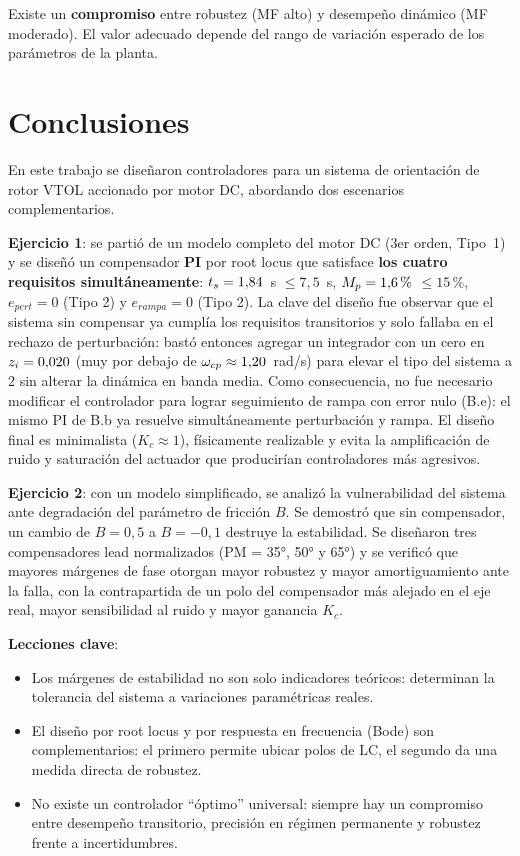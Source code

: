 \documentclass[12pt, a4paper]{article}
\begin{document}
Existe un \textbf{compromiso} entre robustez (MF alto) y desempeño dinámico (MF moderado). El valor adecuado depende del rango de variación esperado de los parámetros de la planta.


\newpage
\section{Conclusiones}

En este trabajo se diseñaron controladores para un sistema de orientación de rotor VTOL accionado por motor DC, abordando dos escenarios complementarios.

\textbf{Ejercicio 1}: se partió de un modelo completo del motor DC (3er orden, Tipo~1) y se diseñó un compensador \textbf{PI} por root locus que satisface \textbf{los cuatro requisitos simultáneamente}: $t_s = 1{,}84$~s $\leq 7{,}5$~s, $M_p = 1{,}6\,\%$ $\leq 15\,\%$, $e_{pert} = 0$ (Tipo 2) y $e_{rampa} = 0$ (Tipo 2). La clave del diseño fue observar que el sistema sin compensar ya cumplía los requisitos transitorios y solo fallaba en el rechazo de perturbación: bastó entonces agregar un integrador con un cero en $z_i = 0{,}020$ (muy por debajo de $\omega_{cp} \approx 1{,}20$~rad/s) para elevar el tipo del sistema a 2 sin alterar la dinámica en banda media. Como consecuencia, no fue necesario modificar el controlador para lograr seguimiento de rampa con error nulo (B.e): el mismo PI de B.b ya resuelve simultáneamente perturbación y rampa. El diseño final es minimalista ($K_c \approx 1$), físicamente realizable y evita la amplificación de ruido y saturación del actuador que producirían controladores más agresivos.

\textbf{Ejercicio 2}: con un modelo simplificado, se analizó la vulnerabilidad del sistema ante degradación del parámetro de fricción $B$. Se demostró que sin compensador, un cambio de $B = 0{,}5$ a $B = -0{,}1$ destruye la estabilidad. Se diseñaron tres compensadores lead normalizados (PM = 35°, 50° y 65°) y se verificó que mayores márgenes de fase otorgan mayor robustez y mayor amortiguamiento ante la falla, con la contrapartida de un polo del compensador más alejado en el eje real, mayor sensibilidad al ruido y mayor ganancia $K_c$.

\textbf{Lecciones clave}:
\begin{itemize}
    \item Los márgenes de estabilidad no son solo indicadores teóricos: determinan la tolerancia del sistema a variaciones paramétricas reales.
    \item El diseño por root locus y por respuesta en frecuencia (Bode) son complementarios: el primero permite ubicar polos de LC, el segundo da una medida directa de robustez.
    \item No existe un controlador ``óptimo'' universal: siempre hay un compromiso entre desempeño transitorio, precisión en régimen permanente y robustez frente a incertidumbres.
\end{itemize}

\end{document}
